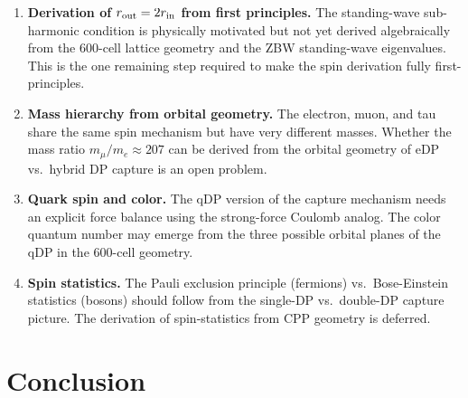 \documentclass[12pt]{article}
\newcommand{\rin}{r_{\rm in}}
\newcommand{\rout}{r_{\rm out}}
\begin{document}
\begin{enumerate}
  \item \textbf{Derivation of $\rout = 2\rin$ from first principles.}
    The standing-wave sub-harmonic condition is physically motivated but
    not yet derived algebraically from the 600-cell lattice geometry and
    the ZBW standing-wave eigenvalues.  This is the one remaining step
    required to make the spin derivation fully first-principles.

  \item \textbf{Mass hierarchy from orbital geometry.}  The electron,
    muon, and tau share the same spin mechanism but have very different
    masses.  Whether the mass ratio $m_\mu/m_e \approx 207$ can be derived
    from the orbital geometry of eDP vs.\ hybrid DP capture is an open
    problem.

  \item \textbf{Quark spin and color.}  The qDP version of the capture
    mechanism needs an explicit force balance using the strong-force
    Coulomb analog.  The color quantum number may emerge from the three
    possible orbital planes of the qDP in the 600-cell geometry.

  \item \textbf{Spin statistics.}  The Pauli exclusion principle
    (fermions) vs.\ Bose-Einstein statistics (bosons) should follow from
    the single-DP vs.\ double-DP capture picture.  The derivation of
    spin-statistics from CPP geometry is deferred.
\end{enumerate}

\section{Conclusion}
\label{sec:conclusion}
\end{document}
